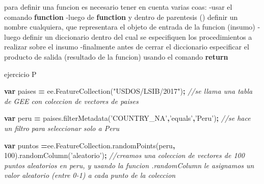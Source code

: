 \documentclass[
]{article}
\newenvironment{Shaded}{\begin{snugshade}}{\end{snugshade}}
\newcommand{\AttributeTok}[1]{\textcolor[rgb]{0.77,0.63,0.00}{#1}}
\newcommand{\CommentTok}[1]{\textcolor[rgb]{0.56,0.35,0.01}{\textit{#1}}}
\newcommand{\DecValTok}[1]{\textcolor[rgb]{0.00,0.00,0.81}{#1}}
\newcommand{\KeywordTok}[1]{\textcolor[rgb]{0.13,0.29,0.53}{\textbf{#1}}}
\newcommand{\NormalTok}[1]{#1}
\newcommand{\OperatorTok}[1]{\textcolor[rgb]{0.81,0.36,0.00}{\textbf{#1}}}
\newcommand{\StringTok}[1]{\textcolor[rgb]{0.31,0.60,0.02}{#1}}
\newcommand{\VariableTok}[1]{\textcolor[rgb]{0.00,0.00,0.00}{#1}}
\begin{document}
para definir una funcion es necesario tener en cuenta varias coas: -usar
el comando \textbf{function} -luego de \textbf{function} y dentro de
parentesis () definir un nombre cualquiera, que representara el objeto
de entrada de la funcion (insumo) -luego definir un diccionario dentro
del cual se especifiquen los procedimientos a realizar sobre el insumo
-finalmente antes de cerrar el diccionario especificar el producto de
salida (resultado de la funcion) usando el comando \textbf{return}

ejercicio P

\begin{Shaded}
\begin{Highlighting}[]
\KeywordTok{var}\NormalTok{ paises }\OperatorTok{=} \VariableTok{ee}\NormalTok{.}\AttributeTok{FeatureCollection}\NormalTok{(}\StringTok{"USDOS/LSIB/2017"}\NormalTok{)}\OperatorTok{;} \CommentTok{//se llama una tabla de GEE con coleccion de vectores de paises }

\KeywordTok{var}\NormalTok{ peru }\OperatorTok{=} \VariableTok{paises}\NormalTok{.}\AttributeTok{filterMetadata}\NormalTok{(}\StringTok{'COUNTRY_NA'}\OperatorTok{,}\StringTok{'equals'}\OperatorTok{,}\StringTok{'Peru'}\NormalTok{)}\OperatorTok{;} \CommentTok{//se hace un filtro para seleccionar solo a Peru }

\KeywordTok{var}\NormalTok{ puntos }\OperatorTok{=}\VariableTok{ee}\NormalTok{.}\VariableTok{FeatureCollection}\NormalTok{.}\AttributeTok{randomPoints}\NormalTok{(peru}\OperatorTok{,} \DecValTok{100}\NormalTok{).}\AttributeTok{randomColumn}\NormalTok{(}\StringTok{'aleatorio'}\NormalTok{)}\OperatorTok{;} \CommentTok{//creamos una coleccion de vectores de 100 puntos aleatorios en peru, y usando la funcion .randomColumn le asignamos un valor aleatorio (entre 0-1) a cada punto de la coleccion  }


\end{Highlighting}
\end{Shaded}
\end{document}
